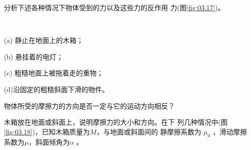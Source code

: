 \begin{questions}

  \question 分析下述各种情况下物体受到的力以及这些力的反作用
  力(图\ref{fig:03.17})。

  \begin{figurex}
    \centering
     \hspace{4em}
    \setcounter{subfigure}{2}
    \\[1em]
    \setcounter{subfigure}{1}
     \hspace{4em}
    \setcounter{subfigure}{3}
    \caption{}
    \label{fig:03.17}
  \end{figurex}

  (a) 静止在地面上的木箱；

  (b) 悬挂着的电灯；

  (c) 粗糙地面上被拖着走的重物；

  (d)沿固定的粗糙斜面下滑的物件。

  \question 物体所受的摩擦力的方向是否一定与它的运动方向相反？

  \question 木箱放在地面或斜面上，说明摩擦力的大小和方向。在下
  列几种情况中(图\ref{fig:03.18})，已知木箱质量为$ M $，与地面或斜面间的
  静摩擦系数为 $ \mu _ { 0 } $  ，滑动摩擦系数为$ \mu $，斜面倾角为$ \alpha $ 。


\end{questions}
